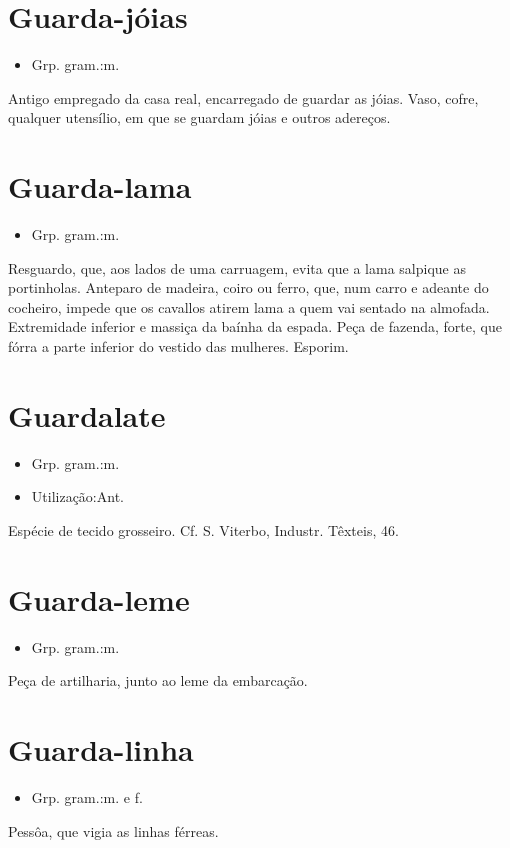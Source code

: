 \section{Guarda-jóias}
\begin{itemize}
\item {Grp. gram.:m.}
\end{itemize}
Antigo empregado da casa real, encarregado de guardar as jóias.
Vaso, cofre, qualquer utensílio, em que se guardam jóias e outros adereços.
\section{Guarda-lama}
\begin{itemize}
\item {Grp. gram.:m.}
\end{itemize}
Resguardo, que, aos lados de uma carruagem, evita que a lama salpique as portinholas.
Anteparo de madeira, coiro ou ferro, que, num carro e adeante do cocheiro, impede que os cavallos atirem lama a quem vai sentado na almofada.
Extremidade inferior e massiça da baínha da espada.
Peça de fazenda, forte, que fórra a parte inferior do vestido das mulheres.
Esporim.
\section{Guardalate}
\begin{itemize}
\item {Grp. gram.:m.}
\end{itemize}
\begin{itemize}
\item {Utilização:Ant.}
\end{itemize}
Espécie de tecido grosseiro. Cf. S. Viterbo, \textunderscore Industr. Têxteis\textunderscore , 46.
\section{Guarda-leme}
\begin{itemize}
\item {Grp. gram.:m.}
\end{itemize}
Peça de artilharia, junto ao leme da embarcação.
\section{Guarda-linha}
\begin{itemize}
\item {Grp. gram.:m.  e  f.}
\end{itemize}
Pessôa, que vigia as linhas férreas.
